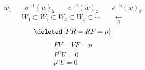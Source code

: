 \[
w_1\qquad\sigma^{-1}(w)_2\qquad\sigma^{-2}(w)_2\qquad\sigma^{-3}(w)_3
\]
\[
\overline{W}_1\subset\overline{W}_2\subset\overline{W}_3\subset\overline{W}_4\subset\cdots
\qquad\underset{R}{\longleftarrow}
\]
\[
\deleted{FR=RF=p}
\]
\[
\boxed{\begin{gathered}FV=VF=p\\F^nU=0\\p^nU=0\end{gathered}}
\]
